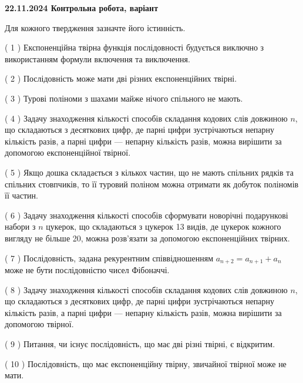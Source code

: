 \documentclass[12pt, ukrainian]{article}
\begin{document}
\vspace{4mm}
\newpage
\begin {large}

\textbf{22.11.2024 Контрольна робота, варіант  }\par


{
Для кожного твердження зазначте його істинність.\par
\vspace{2mm}
( 1 ) Експоненційна твірна функція послідовності будується виключно з використанням формули включення та виключення.%

( 2 ) Послідовність може мати дві різних експоненційних твірні.%

( 3 ) Турові поліноми з шахами майже нічого спільного не мають.%

( 4 ) Задачу знаходження кількості способів складання кодових слів довжиною $n$, що складаються з десяткових цифр, де парні цифри зустрічаються непарну кількість разів, а парні цифри — непарну кількість разів, можна вирішити за допомогою експоненційної твірної.%

( 5 ) Якщо дошка складається з кількох частин, що не мають спільних рядків та спільних стовпчиків, то її туровий поліном можна отримати як добуток поліномів її частин.%

( 6 ) Задачу знаходження кількості способів сформувати новорічні подарункові набори з $n$ цукерок, що складаються з цукерок 13 видів, де цукерок кожного вигляду не більше 20, можна розв’язати за допомогою експоненційних твірних.%

( 7 ) Послідовність, задана рекурентним співвідношенням $a_{n+2}=a_{n+1}+a_{n}$ може не бути послідовністю чисел Фібоначчі.%

( 8 ) Задачу знаходження кількості способів складання кодових слів довжиною $n$, що складаються з десяткових цифр, де парні цифри зустрічаються непарну кількість разів, а парні цифри — непарну кількість разів, можна вирішити за допомогою твірної.%

( 9 ) Питання, чи існує послідовність, що має дві різні твірні, є відкритим.%

( 10 ) Послідовність, що має експоненційну твірну, звичайної твірної може не мати.%


\vspace{5mm}
}
\end {large}
\end{document}
